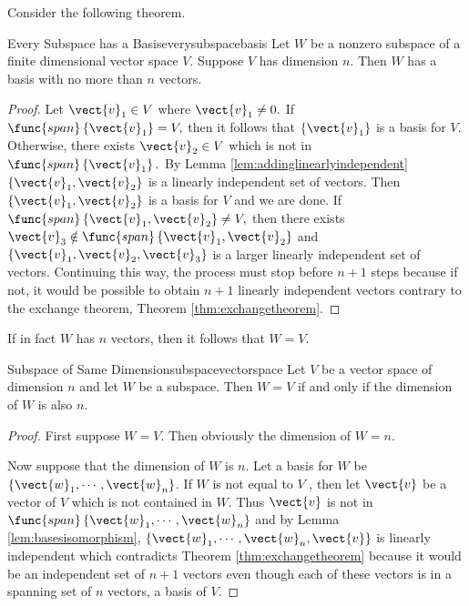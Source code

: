 Consider the following theorem. 

\begin{theorem}{Every Subspace has a Basis}{everysubspacebasis}
Let $W$ be a nonzero subspace of a finite dimensional vector
space $V$. Suppose $V$ has dimension $n$.
 Then $W$ has a basis with no more than $n$
vectors.
\end{theorem}

\begin{proof}
Let $\vect{v}_{1}\in V$ where $\vect{v}_{1}\neq 0.$ If $
\func{span}\left\{ \vect{v}_{1}\right\} =V,$ then it follows that $\left\{ \vect{v}
_{1}\right\} $ is a basis for $V$. Otherwise, there exists $\vect{v}
_{2}\in V$ which is not in $\func{span}\left\{ \vect{v}_{1}\right\} .$ By
Lemma \ref{lem:addinglinearlyindependent} $\left\{ \vect{v}_{1},\vect{v}_{2}\right\} $ is a
linearly independent set of vectors. Then $\left\{ \vect{v}_{1},\vect{v}
_{2}\right\} $ is a basis for $V$ and we are done. If $\func{span}\left\{ \vect{v}_{1},
\vect{v}_{2}\right\} \neq V,$ then there exists $\vect{v}_{3}\notin \func{
span}\left\{ \vect{v}_{1},\vect{v}_{2}\right\} $ and $\left\{ \vect{v}
_{1},\vect{v}_{2},\vect{v}_{3}\right\} $ is a larger linearly
independent set of vectors. Continuing this way, the process must stop
before $n+1$ steps because if not, it would be possible to obtain $n+1$
linearly independent vectors contrary to the exchange theorem, Theorem \ref{thm:exchangetheorem}. 
\end{proof}

If in fact $W$ has $n$ vectors, then it follows that $W=V$. 

\begin{theorem}{Subspace of Same Dimension}{subspacevectorspace}
Let $V$ be a vector space of dimension $n$ and let $W$ be a
subspace. Then $W=V$ if and only if the dimension of $W$ is also $n$.
\end{theorem}

\begin{proof}First suppose $W=V.$ Then obviously the dimension of $W=n.$

Now suppose that the dimension of $W$ is $n$. Let a basis for $W$ be $
\left\{ \vect{w}_{1},\cdots ,\vect{w}_{n}\right\} $. If $W$ is not equal to $V$
, then let $\vect{v}$ be a vector of $V$ which is not contained in $W.$ Thus $
\vect{v}$ is not in $\func{span}\left\{ \vect{w}_{1},\cdots ,\vect{w}
_{n}\right\} $ and by Lemma \ref{lem:basesisomorphism}, $\left\{ \vect{w}_{1},\cdots ,\vect{w}_{n},\vect{v}\right\} $ is linearly independent which contradicts
Theorem \ref{thm:exchangetheorem} because it would be an independent set of $n+1$
vectors even though each of these vectors is in a spanning set of $n$
vectors, a basis of $V$. 
\end{proof}


